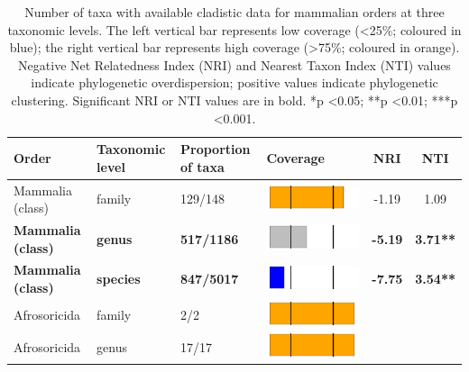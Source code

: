\begin{longtable}{lL{1.8cm}C{2cm}lcc}
\caption{Number of taxa with available cladistic data for mammalian orders at three
taxonomic levels. The left vertical bar represents low coverage (\textless 25\%; coloured in blue); the right vertical bar represents high coverage (\textgreater 75\%; coloured in orange). Negative Net Relatedness Index (NRI) and Nearest Taxon Index (NTI) values indicate phylogenetic overdispersion; positive values indicate phylogenetic clustering. Significant NRI or NTI values are in bold. *p \textless 0.05; **p \textless 0.01; ***p \textless 0.001.
} \\ 

  \hline
Order & Taxonomic level & Proportion of taxa & Coverage & NRI & NTI \\ 
  \hline
  Mammalia (class) & family & 129/148 & \includegraphics[width=0.20\linewidth, height=0.05\linewidth]{Table_figures/bar40.pdf} & -1.19 & 1.09 \\ 
  \textbf{Mammalia (class)} & \textbf{genus} & \textbf{517/1186} & \includegraphics[width=0.20\linewidth, height=0.05\linewidth]{Table_figures/bar41.pdf} & \textbf{-5.19} & \textbf{3.71**} \\ 
  \textbf{Mammalia (class)} & \textbf{species} & \textbf{847/5017} & \includegraphics[width=0.20\linewidth, height=0.05\linewidth]{Table_figures/bar42.pdf} & \textbf{-7.75} & \textbf{3.54**} \\ 
  Afrosoricida & family & 2/2 & \includegraphics[width=0.20\linewidth, height=0.05\linewidth]{Table_figures/bar1.pdf} &   &   \\ 
  Afrosoricida & genus & 17/17 & \includegraphics[width=0.20\linewidth, height=0.05\linewidth]{Table_figures/bar2.pdf} &   &   \\ 

\end{longtable}
